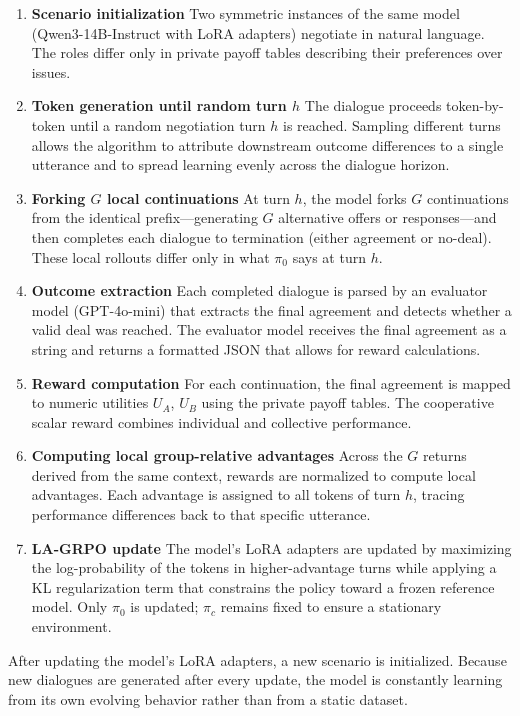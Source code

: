 \documentclass[12pt,a4paper]{article}
\begin{document}
\begin{enumerate}
     \item \textbf{Scenario initialization}
     \newline
     Two symmetric instances of the same model (Qwen3-14B-Instruct with LoRA adapters) negotiate in natural language. The roles differ only in private payoff tables describing their preferences over issues.
     \item \textbf{Token generation until random turn $h$}
     \newline
     The dialogue proceeds token-by-token until a random negotiation turn $h$ is reached. Sampling different turns allows the algorithm to attribute downstream outcome differences to a single utterance and to spread learning evenly across the dialogue horizon.
     \item \textbf{Forking $G$ local continuations}
     \newline
     At turn $h$, the model forks $G$ continuations from the identical prefix---generating $G$ alternative offers or responses---and then completes each dialogue to termination (either agreement or no-deal). These local rollouts differ only in what $\pi_0$ says at turn $h$.
     \item \textbf{Outcome extraction}
     \newline
     Each completed dialogue is parsed by an evaluator model (GPT-4o-mini) that extracts the final agreement and detects whether a valid deal was reached. The evaluator model receives the final agreement as a string and returns a formatted JSON that allows for reward calculations.
     \item \textbf{Reward computation}
     \newline
     For each continuation, the final agreement is mapped to numeric utilities $U_A$, $U_B$ using the private payoff tables. The cooperative scalar reward combines individual and collective performance.
     \item \textbf{Computing local group-relative advantages}
     \newline
     Across the $G$ returns derived from the same context, rewards are normalized to compute local advantages. Each advantage is assigned to all tokens of turn $h$, tracing performance differences back to that specific utterance.
     \item \textbf{LA-GRPO update}
     \newline
     The model's LoRA adapters are updated by maximizing the log-probability of the tokens in higher-advantage turns while applying a KL regularization term that constrains the policy toward a frozen reference model. Only $\pi_0$ is updated; $\pi_c$ remains fixed to ensure a stationary environment.
\end{enumerate}
After updating the model's LoRA adapters, a new scenario is initialized. Because new dialogues are generated after every update, the model is constantly learning from its own evolving behavior rather than from a static dataset.
\end{document}
